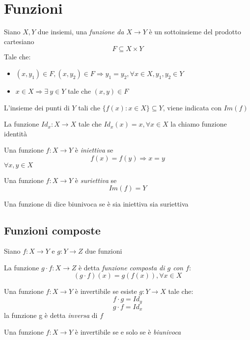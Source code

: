    \section{Funzioni}
        \begin{definition}[Funzione]
            Siano $X,Y$ due insiemi, una \emph{funzione da $X \rightarrow Y$} è un sottoinsieme del prodotto cartesiano $$F \subseteq X\times Y$$
            Tale che:
            \begin{itemize}
                \item $(x,y_1) \in F, (x,y_2) \in F \Rightarrow y_1 = y_2, \forall x \in X, y_1,y_2 \in Y$
                \item $x \in X \Rightarrow \exists \ y \in Y$ tale che $(x,y) \in F$ 
            \end{itemize}
        \end{definition}
        \begin{definition}
            L'insieme dei punti di $Y$ tali che $\{f(x):x \in X\} \subseteq Y$, viene indicata con $Im(f)$
        \end{definition}
        \begin{definition}
            La funzione $Id_x : X \rightarrow X$ tale che $Id_x(x) = x, \forall x \in X$ la chiamo funzione identità
        \end{definition}
        \begin{definition}
            Una funzione $f : X \rightarrow Y$ è \emph{iniettiva} se $$f(x)=f(y) \Rightarrow x=y$$ $\forall x,y \in X$
        \end{definition}
        \begin{definition}
            Una funzione $f : X \rightarrow Y$ è \emph{suriettiva} se $$Im(f)=Y$$ 
        \end{definition}
        \begin{definition}
            Una funzione di dice biunivoca se è sia iniettiva sia suriettiva
        \end{definition}
        \subsection{Funzioni composte}
            Siano $f: X \rightarrow Y$ e $g: Y \rightarrow Z$ due funzioni
            \begin{definition}
                La funzione $g \cdot f : X \rightarrow Z$ è detta \emph{funzione composta di $g$ con $f$}: $$(g \cdot f)(x) = g(f(x)), \forall x \in X$$
            \end{definition}
            \begin{definition}
                Una funzione $f: X \rightarrow Y$ è invertibile se esiste $g: Y \rightarrow X$ tale che:
                $$f \cdot g = Id_y$$
                $$g\cdot f = Id_x$$
                la funzione g è detta \emph{inversa} di $f$
            \end{definition}
            \begin{proposition}
                Una funzione $f: X \rightarrow Y$ è invertibile se e solo se è \emph{biunivoca}
            \end{proposition}
